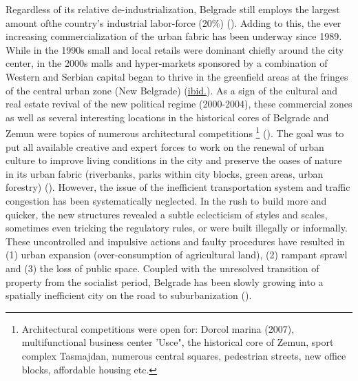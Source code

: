 \documentclass[11pt]{report}
\begin{document}
{{{{%
Regardless of  its relative de-industrialization, Belgrade  still  employs the largest amount ofthe country’s industrial labor-force (20\%)  (\href{Hirt}{\citealt{hirt_belgrade_2009}}).
Adding to this, the ever increasing commercialization of the urban fabric has been underway since 1989. While in the 1990s small and local retails were dominant chiefly around the city center, in the 2000s malls and hyper-markets sponsored by a combination of Western and Serbian capital began to thrive in the greenfield areas at the fringes of the central urban zone (New Belgrade) (\href{ibid.}{ibid.}).
As a sign of the cultural and real estate revival of the new political regime (2000-2004), these commercial zones as well as several interesting locations in the historical cores of Belgrade and Zemun were topics of numerous architectural competitions 
\footnote{Architectural competitions were open for: Dorcol marina (2007), multifunctional business center 'Usce", the historical core of Zemun, sport complex Tasmajdan, numerous central squares, pedestrian streets, new office blocks, affordable housing etc.} %
(\href{Stupar}{\citealt{stupar_recreating_2004}}).
The goal was to put all available creative and expert forces to work on the renewal of urban culture to improve living conditions in the city and preserve the oases of nature in its urban fabric (riverbanks, parks within city blocks, green areas, urban forestry) (\href{Grozdanic}{\citealt{grozdanic_belgrade_2008}}).
However, the issue of the inefficient transportation system and traffic congestion has been systematically neglected. In the rush to build more and quicker, the new structures revealed a subtle eclecticism of styles and scales, sometimes even tricking the regulatory rules, or were built illegally or informally. These uncontrolled and impulsive actions and faulty procedures have resulted in (1) urban expansion (over-consumption of agricultural land), (2) rampant sprawl and (3) the loss of public space. Coupled with the unresolved transition of property from the socialist period, Belgrade has been slowly growing into a spatially inefficient city on the road to suburbanization (\href{Zekovic}{\citealt{zekovic_spatial_2015}}).
\\

}}}}
\end{document}
